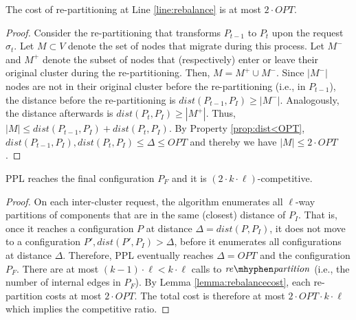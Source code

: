 \documentclass[manuscript,screen=true]{acmart}
\newcommand{\OPT}{\mathit{OPT}}
\newcommand\mahmoud[1]{\color{green}\textbf{\\ Mahmoud: #1}\\\color{black}}
\begin{document}
\begin{lemma}	\label{lemma:rebalancecost}
    The cost of re-partitioning at Line \ref{line:rebalance} is at most $2\cdot\OPT$.
\end{lemma}
\begin{proof}
    Consider the re-partitioning that transforms $P_{t-1}$ to $P_t$ upon the request $\sigma_t$.
    Let $M \subset V$ denote the set of nodes that migrate during this process.
	Let $M^-$ and $M^+$ denote the subset of nodes that (respectively)
    enter or leave their original cluster during the re-partitioning.    
    Then,
    $M = M^+ \cup M^-$.
    Since $|M^-|$ nodes are not in their original cluster before the re-partitioning (i.e., in $P_{t-1}$),
    the distance before the re-partitioning is $\mathit{dist}(P_{t-1},P_I) \geq | M^-|$.
    Analogously,
     the distance afterwards is $\mathit{dist}(P_{t},P_I) \geq | M^+|$.
    Thus,
    $|M| \leq \mathit{dist}(P_{t-1},P_I) + \mathit{dist}(P_{t},P_I)$.
    By Property \ref{prop:dist<OPT},
    $\mathit{dist}(P_{t-1},P_I) , \mathit{dist}(P_{t},P_I) \leq \Delta \leq \OPT$
    and thereby we have	
    $|M| \leq 2\cdot\OPT$.
\end{proof}

\begin{theorem}	\label{thm:upperbound}
    PPL reaches the final configuration $P_F$ and it is $(2\cdot k\cdot\ell)$-competitive.
\end{theorem}
\begin{proof}
      On each inter-cluster request,
     the algorithm enumerates all $\ell$-way partitions of components
     that are in the same (closest) distance of $P_I$.
     That is, 
     once it reaches a configuration $P$ at distance $\Delta = \mathit{dist} (P, P_I)$,
     it does not move to a configuration
     $P', \mathit{dist} (P', P_I) > \Delta$,
     before it enumerates all configurations at distance $\Delta$.
     Therefore,
     PPL eventually reaches $\Delta=\OPT$ and the configuration $P_F$.
    There are at most $(k-1)\cdot\ell < k\cdot\ell $ calls   to $\mathit{re\mhyphen partition}$
     (i.e., the number of internal edges in $P_F$).
    By Lemma \ref{lemma:rebalancecost},
    each re-partition costs at most $2\cdot\OPT$.
    The total cost is therefore at most $2\cdot\OPT\cdot k\cdot\ell$ which implies the competitive ratio.
 \end{proof}
\end{document}
